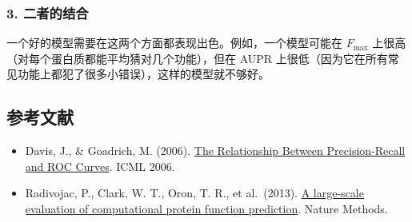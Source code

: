 \hypertarget{ux4e8cux8005ux7684ux7ed3ux5408}{%
\subsubsection{3. 二者的结合}\label{ux4e8cux8005ux7684ux7ed3ux5408}}

一个好的模型需要在这两个方面都表现出色。例如，一个模型可能在 \(F_{\max}\) 上很高（对每个蛋白质都能平均猜对几个功能），但在 AUPR 上很低（因为它在所有常见功能上都犯了很多小错误），这样的模型就不够好。

\hypertarget{ux53c2ux8003ux6587ux732e-33}{%
\subsection{参考文献}\label{ux53c2ux8003ux6587ux732e-33}}

\vspace{0.25em}
\begin{itemize}
\tightlist
\item
  Davis, J., \& Goadrich, M. (2006). \href{https://doi.org/10.1145/1143844.1143874}{The Relationship Between Precision-Recall and ROC Curves}. ICML 2006.
\item
  Radivojac, P., Clark, W. T., Oron, T. R., et al.~(2013). \href{https://www.nature.com/articles/nmeth.2340}{A large-scale evaluation of computational protein function prediction}. Nature Methods.
\end{itemize}

\clearpage
